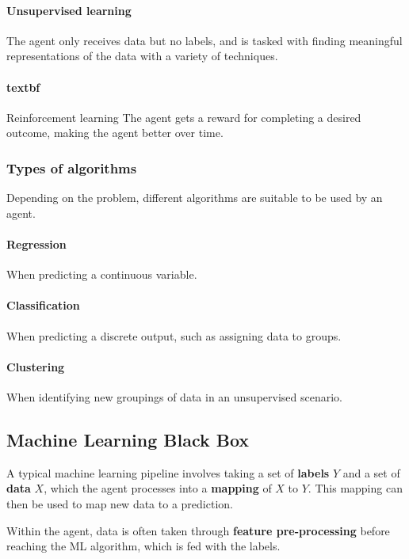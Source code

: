 \paragraph{Unsupervised learning} The agent only receives data but no labels, and is tasked with finding meaningful representations of the data with a variety of techniques.

\paragraph{textbf}{Reinforcement learning} The agent gets a reward for completing a desired outcome, making the agent better over time.

\subsubsection{Types of algorithms}

Depending on the problem, different algorithms are suitable to be used by an agent.

\paragraph{Regression} When predicting a continuous variable.

\paragraph{Classification} When predicting a discrete output, such as assigning data to groups.

\paragraph{Clustering} When identifying new groupings of data in an unsupervised scenario.

\subsection{Machine Learning Black Box}

A typical machine learning pipeline involves taking a set of \textbf{labels} \(Y\) and a set of \textbf{data} \(X\), which the agent processes into a \textbf{mapping} of \(X\) to \(Y\). This mapping can then be used to map new data to a prediction.

Within the agent, data is often taken through \textbf{feature pre-processing} before reaching the ML algorithm, which is fed with the labels.

